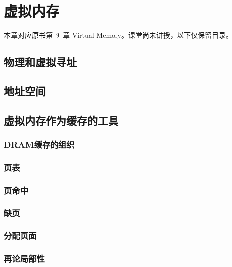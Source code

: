 \chapter{虚拟内存}

本章对应原书第~9~章 Virtual Memory。课堂尚未讲授，以下仅保留目录。

\section{物理和虚拟寻址}

\pending

\section{地址空间}

\pending

\section{虚拟内存作为缓存的工具}

\pending

\subsection{DRAM缓存的组织}

\pending

\subsection{页表}

\pending

\subsection{页命中}

\pending

\subsection{缺页}

\pending

\subsection{分配页面}

\pending

\subsection{再论局部性}

